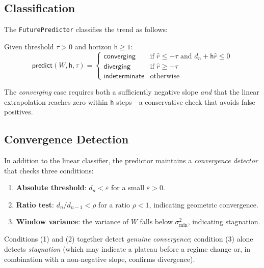 \documentclass[11pt]{article}
\newcommand{\Horizon}{\mathsf{h}}           %
\newcommand{\DescentN}{d_n}                 %
\newcommand{\DescentRate}{r}                %
\newcommand{\Thresh}{\tau}                  %
\newcommand{\Predict}{\mathsf{predict}}     %
\begin{document}
\subsection{Classification}

The \texttt{FuturePredictor} classifies the trend as follows:

\begin{definition}\label{def:predict-class}
Given threshold $\Thresh > 0$ and horizon $\Horizon \ge 1$:
\[
  \Predict(W, \Horizon, \Thresh) = \begin{cases}
    \mathsf{converging}    & \text{if } \hat{\DescentRate} \le -\Thresh
                             \text{ and } d_n + \Horizon\hat{\DescentRate} \le 0 \\
    \mathsf{diverging}     & \text{if } \hat{\DescentRate} \ge +\Thresh \\
    \mathsf{indeterminate} & \text{otherwise}
  \end{cases}
\]
\end{definition}

\noindent
The \emph{converging} case requires both a sufficiently negative slope
\emph{and} that the linear extrapolation reaches zero within $\Horizon$
steps—a conservative check that avoids false positives.

\subsection{Convergence Detection}

In addition to the linear classifier, the predictor maintains a
\emph{convergence detector} that checks three conditions:

\begin{enumerate}
  \item \textbf{Absolute threshold}: $\DescentN < \varepsilon$ for a
        small $\varepsilon > 0$.
  \item \textbf{Ratio test}: $\DescentN / d_{n-1} < \rho$ for a
        ratio $\rho < 1$, indicating geometric convergence.
  \item \textbf{Window variance}: the variance of $W$ falls below
        $\sigma^2_{\min}$, indicating stagnation.
\end{enumerate}

Conditions (1) and (2) together detect \emph{genuine convergence};
condition (3) alone detects \emph{stagnation} (which may indicate a
plateau before a regime change or, in combination with a non-negative
slope, confirms divergence).
\end{document}
